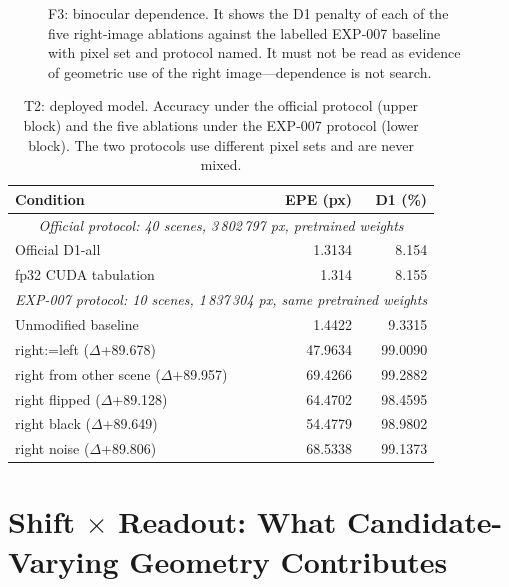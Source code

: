 \documentclass[conference]{IEEEtran}
\begin{document}
\begin{figure}[t]
\centering
{}
\caption{F3: binocular dependence. It shows the D1 penalty of each of the five right-image ablations against the labelled EXP-007 baseline with pixel set and protocol named. It must not be read as evidence of geometric use of the right image---dependence is not search.}
\label{fig:f3}
\end{figure}

\begin{table}[t]
\centering
\caption{T2: deployed model. Accuracy under the official protocol (upper block) and the five ablations under the EXP-007 protocol (lower block). The two protocols use different pixel sets and are never mixed.}
\label{tab:t2}
\begin{tabular}{lrr}
\toprule
Condition & EPE (px) & D1 (\%) \\
\midrule
\multicolumn{3}{c}{\emph{Official protocol: 40 scenes, 3\,802\,797 px, pretrained weights}} \\
Official D1-all & 1.3134 & 8.154 \\
fp32 CUDA tabulation & 1.314 & 8.155 \\
\midrule
\multicolumn{3}{c}{\emph{EXP-007 protocol: 10 scenes, 1\,837\,304 px, same pretrained weights}} \\
Unmodified baseline & 1.4422 & 9.3315 \\
\quad right:=left ($\Delta$+89.678) & 47.9634 & 99.0090 \\
\quad right from other scene ($\Delta$+89.957) & 69.4266 & 99.2882 \\
\quad right flipped ($\Delta$+89.128) & 64.4702 & 98.4595 \\
\quad right black ($\Delta$+89.649) & 54.4779 & 98.9802 \\
\quad right noise ($\Delta$+89.806) & 68.5338 & 99.1373 \\
\bottomrule
\end{tabular}
\end{table}

\section{Shift $\times$ Readout: What Candidate-Varying Geometry Contributes}
\label{sec:pillar2}
\end{document}
